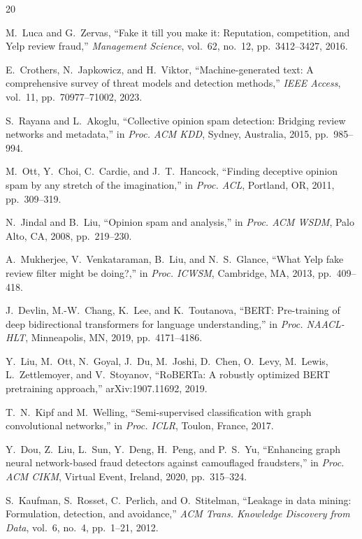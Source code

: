\documentclass[conference]{IEEEtran}
\begin{document}
\begin{thebibliography}{20}

M.~Luca and G.~Zervas, ``Fake it till you make it: Reputation, competition, and Yelp review fraud,'' \textit{Management Science}, vol.~62, no.~12, pp.~3412--3427, 2016.

E.~Crothers, N.~Japkowicz, and H.~Viktor, ``Machine-generated text: A comprehensive survey of threat models and detection methods,'' \textit{IEEE Access}, vol.~11, pp.~70977--71002, 2023.

S.~Rayana and L.~Akoglu, ``Collective opinion spam detection: Bridging review networks and metadata,'' in \textit{Proc. ACM KDD}, Sydney, Australia, 2015, pp.~985--994.

M.~Ott, Y.~Choi, C.~Cardie, and J.~T.~Hancock, ``Finding deceptive opinion spam by any stretch of the imagination,'' in \textit{Proc. ACL}, Portland, OR, 2011, pp.~309--319.

N.~Jindal and B.~Liu, ``Opinion spam and analysis,'' in \textit{Proc. ACM WSDM}, Palo Alto, CA, 2008, pp.~219--230.

A.~Mukherjee, V.~Venkataraman, B.~Liu, and N.~S.~Glance, ``What Yelp fake review filter might be doing?,'' in \textit{Proc. ICWSM}, Cambridge, MA, 2013, pp.~409--418.

J.~Devlin, M.-W.~Chang, K.~Lee, and K.~Toutanova, ``BERT: Pre-training of deep bidirectional transformers for language understanding,'' in \textit{Proc. NAACL-HLT}, Minneapolis, MN, 2019, pp.~4171--4186.

Y.~Liu, M.~Ott, N.~Goyal, J.~Du, M.~Joshi, D.~Chen, O.~Levy, M.~Lewis, L.~Zettlemoyer, and V.~Stoyanov, ``RoBERTa: A robustly optimized BERT pretraining approach,'' arXiv:1907.11692, 2019.

T.~N.~Kipf and M.~Welling, ``Semi-supervised classification with graph convolutional networks,'' in \textit{Proc. ICLR}, Toulon, France, 2017.

Y.~Dou, Z.~Liu, L.~Sun, Y.~Deng, H.~Peng, and P.~S.~Yu, ``Enhancing graph neural network-based fraud detectors against camouflaged fraudsters,'' in \textit{Proc. ACM CIKM}, Virtual Event, Ireland, 2020, pp.~315--324.

S.~Kaufman, S.~Rosset, C.~Perlich, and O.~Stitelman, ``Leakage in data mining: Formulation, detection, and avoidance,'' \textit{ACM Trans. Knowledge Discovery from Data}, vol.~6, no.~4, pp.~1--21, 2012.


\end{thebibliography}
\end{document}
